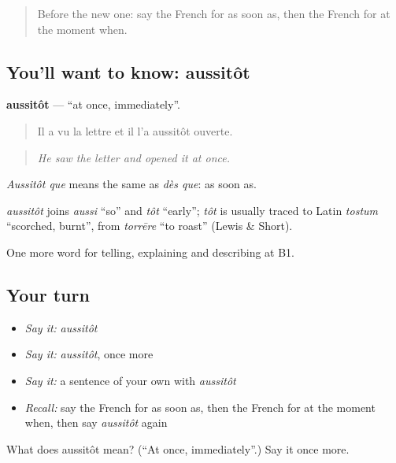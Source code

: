 \begin{quote}
Before the new one: say the French for as soon as, then the French for at the moment when.
\end{quote}

\subsection*{You'll want to know: aussitôt}
\textbf{aussitôt} — \textquotedblleft{}at once, immediately\textquotedblright{}.

\begin{quote}
Il a vu la lettre et il l'a aussitôt ouverte.
\end{quote}

\begin{quote}
\emph{He saw the letter and opened it at once.}
\end{quote}

\emph{Aussitôt que} means the same as \emph{dès que}: as soon as.

\begin{cousinweb}
\emph{aussitôt} joins \emph{aussi} \textquotedblleft{}so\textquotedblright{} and \emph{tôt} \textquotedblleft{}early\textquotedblright{}; \emph{tôt} is usually traced to Latin \emph{tostum} \textquotedblleft{}scorched, burnt\textquotedblright{}, from \emph{torrēre} \textquotedblleft{}to roast\textquotedblright{} (Lewis \& Short).
\end{cousinweb}

\begin{grammarlens}[title={What you've built}]
One more word for telling, explaining and describing at B1.
\end{grammarlens}

\subsection*{Your turn}
\begin{itemize}
\raggedright
  \item \emph{Say it:} \emph{aussitôt}
  \item \emph{Say it:} \emph{aussitôt}, once more
  \item \emph{Say it:} a sentence of your own with \emph{aussitôt}
  \item \emph{Recall:} say the French for as soon as, then the French for at the moment when, then say \emph{aussitôt} again
\end{itemize}

\begin{tcolorbox}[breakable,colback=teal!4,colframe=teal!35!black,title={Before you move on}]
What does aussitôt mean? (\textquotedblleft{}At once, immediately\textquotedblright{}.) Say it once more.
\end{tcolorbox}
